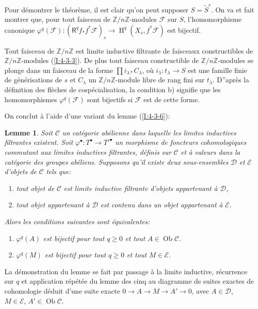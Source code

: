 \documentclass{book}
\DeclareMathOperator{\h}{H}
\DeclareMathOperator{\ob}{Ob}
\newcommand{\cF}{\mathcal{F}}
\newcommand{\dZ}{\mathbb{Z}}
\newcommand{\sC}{\mathscr{C}}
\newcommand{\sD}{\mathscr{D}}
\newcommand{\sE}{\mathscr{E}}
\newcommand{\R}{\mathsf{R}}
\newtheorem{lemma}[subsubsection]{Lemme}
\begin{document}
Pour démontrer le théorème, il est clair qu'on peut supposer 
$S=\widetilde S^s$. On va et fait montrer que, pour tout faisceau de 
$\dZ/n\dZ$-modules $\cF$ sur $S$, l'homomorphisme canonique 
$\varphi^q(\cF):(\R^q f_* f^* \cF)_s \to \h^q(X_s,f^*\cF)$ est bijectif. 

Tout faisceau de $\dZ/n\dZ$ est limite inductive filtrante de faisceaux 
constructibles de $\dZ/n\dZ$-modules (\ref{I:4-3-3}). De plus tout faisceau 
constructible de $\dZ/n\dZ$-modules se plonge dans un faisceau de la forme 
$\prod i_{\lambda *} C_\lambda$, où $i_\lambda:t_\lambda\to S$ est une 
famille finie de générisations de $s$ et $C_\lambda$ un $\dZ/n\dZ$-module 
libre de rang fini sur $t_\lambda$. D''après la définition des flèches de 
cospécialisation, la condition b) signifie que les homomorphismes 
$\varphi^q(\cF)$ sont bijectifs si $\cF$ est de cette forme. 

On conclut à l'aide d'une variant du lemme (\ref{I:4-3-6}):





\begin{lemma}\label{I:5-1-8}
Soit $\sC$ un catégorie abélienne dans laquelle les limites inductives 
filtrantes existent. Soit $\varphi^\bullet:T^\bullet\to{T'}^\bullet$ un 
morphisme de foncteurs cohomologiques commutant aux limites inductives 
filtrantes, définis sur $\sC$ et à valeurs dans la catégorie des groupes 
abéliens. Supposons qu'il existe deux sous-ensembles $\sD$ et $\sE$ d'objets 
de $\sC$ tels que:
\begin{enumerate}[\indent a)]
  \item tout objet de $\sC$ est limite inductive filtrante d'objets appartenant 
    à $\sD$, 
  \item tout objet appartenant à $\sD$ est contenu dans un objet appartenant 
    à $\sE$.
\end{enumerate}

Alors les conditions suivantes sont équivalentes: 
\begin{enumerate}[\indent (i)]
  \item $\varphi^q(A)$ est bijectif pour tout $q\geqslant 0$ et tout 
    $A\in\ob\sC$.
  \item $\varphi^q(M)$ est bijectif pour tout $q\geqslant 0$ et tout $M\in\sE$. 
\end{enumerate}
\end{lemma}

La démonstration du lemme se fait par passage à la limite inductive, 
récurrence sur $q$ et application répétée du lemme des cinq au diagramme 
de suites exactes de cohomologie déduit d'une suite exacte 
$0\to A\to M\to A'\to 0$, avec $A\in\sD$, $M\in\sE$, $A'\in \ob\sC$. 
\end{document}
